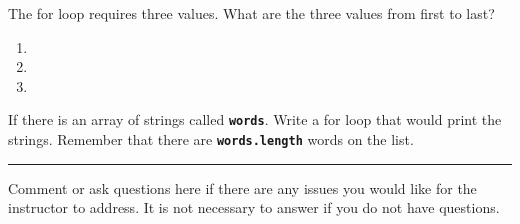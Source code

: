 \documentclass[letterpaper,12pt]{exam}
\begin{document}
\begin{questions}
\begin{samepage}
    \question The for loop requires three values.  What are the three values from first to last?
      \begin{enumerate}
        \item 
        \vspace{5mm}
        \item 
        \vspace{5mm}
        \item 
        \vspace{5mm}
       \end{enumerate}
\end{samepage}
\begin{samepage}
    \question If there is an array of strings called \texttt{\textbf{words}}.  Write a for loop that would print the strings.  Remember that there are \texttt{\textbf{words.length}} words on the list.
    \vspace{5mm}
\end{samepage}




\begin{samepage}
    \begin{center}
    \rule{0.8\textwidth}{.4pt}
    \end{center}
	\question Comment or ask questions here if there are any issues you would like for the instructor to address.  It is not necessary to answer if you do not have questions.
	\vspace{30mm}
\end{samepage}

\end{questions}
\end{document}

